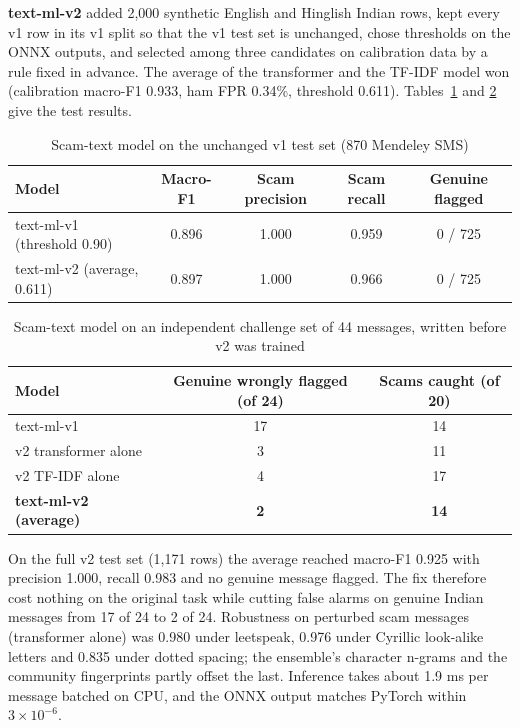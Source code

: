 \noindent \textbf{text-ml-v2} added 2,000 synthetic English and Hinglish Indian rows, kept every v1 row in its v1 split so that the v1 test set is unchanged, chose thresholds on the ONNX outputs, and selected among three candidates on calibration data by a rule fixed in advance. The average of the transformer and the TF-IDF model won (calibration macro-F1 0.933, ham FPR 0.34\%, threshold 0.611). Tables~\ref{tab:text1} and \ref{tab:text2} give the test results.

\begin{table}[H]
\centering
\small
\renewcommand{\arraystretch}{1.15}
\caption{Scam-text model on the unchanged v1 test set (870 Mendeley SMS)}
\label{tab:text1}
\begin{tabular}{|l|c|c|c|c|}
\hline
\textbf{Model} & \textbf{Macro-F1} & \textbf{Scam precision} & \textbf{Scam recall} & \textbf{Genuine flagged} \\ \hline
text-ml-v1 (threshold 0.90) & 0.896 & 1.000 & 0.959 & 0 / 725 \\ \hline
text-ml-v2 (average, 0.611) & 0.897 & 1.000 & 0.966 & 0 / 725 \\ \hline
\end{tabular}
\end{table}

\begin{table}[H]
\centering
\small
\renewcommand{\arraystretch}{1.15}
\caption{Scam-text model on an independent challenge set of 44 messages, written before v2 was trained}
\label{tab:text2}
\begin{tabular}{|l|c|c|}
\hline
\textbf{Model} & \textbf{Genuine wrongly flagged (of 24)} & \textbf{Scams caught (of 20)} \\ \hline
text-ml-v1 & 17 & 14 \\ \hline
v2 transformer alone & 3 & 11 \\ \hline
v2 TF-IDF alone & 4 & 17 \\ \hline
\textbf{text-ml-v2 (average)} & \textbf{2} & \textbf{14} \\ \hline
\end{tabular}
\end{table}

\noindent On the full v2 test set (1,171 rows) the average reached macro-F1 0.925 with precision 1.000, recall 0.983 and no genuine message flagged. The fix therefore cost nothing on the original task while cutting false alarms on genuine Indian messages from 17 of 24 to 2 of 24. Robustness on perturbed scam messages (transformer alone) was 0.980 under leetspeak, 0.976 under Cyrillic look-alike letters and 0.835 under dotted spacing; the ensemble's character n-grams and the community fingerprints partly offset the last. Inference takes about 1.9 ms per message batched on CPU, and the ONNX output matches PyTorch within $3\times10^{-6}$.\\

